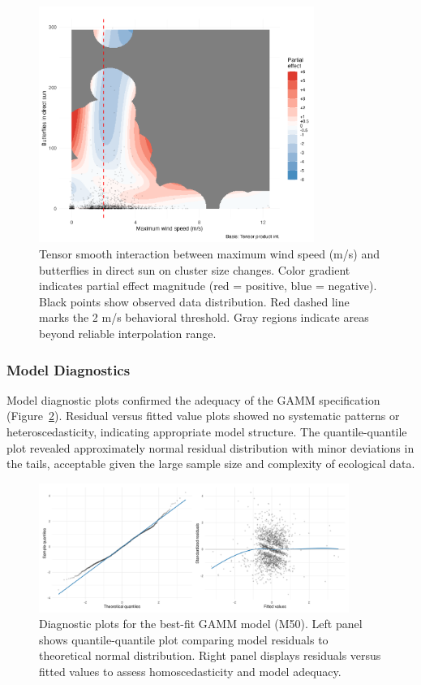 \begin{figure}[htbp]
    \centering
    \includegraphics[width=0.8\textwidth]{supplemental/results/30_min/figures/interaction_wind_x_sun_binned.png}
    \caption{Tensor smooth interaction between maximum wind speed (m/s) and butterflies in direct sun on cluster size changes. Color gradient indicates partial effect magnitude (red = positive, blue = negative). Black points show observed data distribution. Red dashed line marks the 2 m/s behavioral threshold. Gray regions indicate areas beyond reliable interpolation range.}
    \label{fig:interaction_wind_sun}
\end{figure}

\subsubsection{Model Diagnostics}

Model diagnostic plots confirmed the adequacy of the GAMM specification (Figure~\ref{fig:model_diagnostics_30min}). Residual versus fitted value plots showed no systematic patterns or heteroscedasticity, indicating appropriate model structure. The quantile-quantile plot revealed approximately normal residual distribution with minor deviations in the tails, acceptable given the large sample size and complexity of ecological data.

\begin{figure}[htbp]
    \centering
    \includegraphics[width=0.9\textwidth]{supplemental/results/30_min/figures/diag_qq_and_residuals_1x2.png}
    \caption{Diagnostic plots for the best-fit GAMM model (M50). Left panel shows quantile-quantile plot comparing model residuals to theoretical normal distribution. Right panel displays residuals versus fitted values to assess homoscedasticity and model adequacy.}
    \label{fig:model_diagnostics_30min}
\end{figure}

